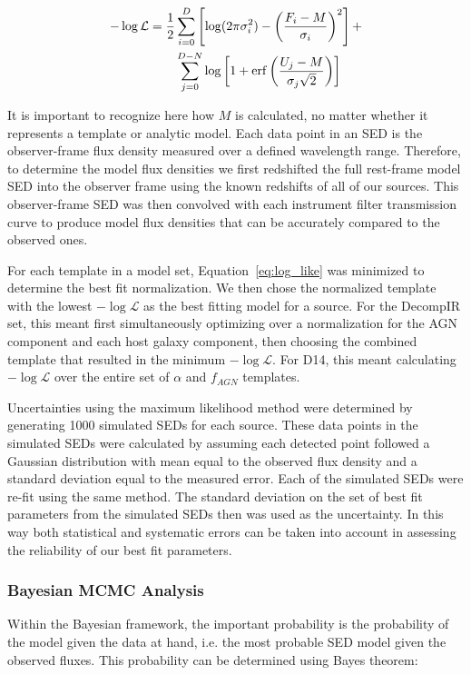 \documentclass[fleqn,usenatbib]{mnras}
\begin{document}
\begin{align}\label{eq:log_like}
-\log\mathcal{L} = \frac{1}{2}&\sum_{i=0}^{D}\left[\log(2\pi\sigma_i^2) - \left(\frac{F_i - M}{\sigma_i}\right)^2\right] + \notag \\
&\sum_{j=0}^{D-N}\log\left[1 + \mathrm{erf}\left(\frac{U_j - M}{\sigma_j\sqrt{2}}\right)\right]
\end{align}

It is important to recognize here how $M$ is calculated, no matter whether it represents a template or analytic model. Each data point in an SED is the observer-frame flux density measured over a defined wavelength range. Therefore, to determine the model flux densities we first redshifted the full rest-frame model SED into the observer frame using the known redshifts of all of our sources. This observer-frame SED was then convolved with each instrument filter transmission curve to produce model flux densities that can be accurately compared to the observed ones.

For each template in a model set, Equation~\ref{eq:log_like} was minimized to determine the best fit normalization. We then chose the normalized template with the lowest $-\log\mathcal{L}$ as the best fitting model for a source. For the DecompIR set, this meant first simultaneously optimizing over a normalization for the AGN component and each host galaxy component, then choosing the combined template that resulted in the minimum $-\log\mathcal{L}$. For D14, this meant calculating $-\log\mathcal{L}$ over the entire set of $\alpha$ and $f_{AGN}$ templates.

Uncertainties using the maximum likelihood method were determined by generating 1000 simulated SEDs for each source. These data points in the simulated SEDs were calculated by assuming each detected point followed a Gaussian distribution with mean equal to the observed flux density and a standard deviation equal to the measured error. Each of the simulated SEDs were re-fit using the same method. The standard deviation on the set of best fit parameters from the simulated SEDs then was used as the uncertainty. In this way both statistical and systematic errors can be taken into account in assessing the reliability of our best fit parameters. 

\subsubsection{Bayesian MCMC Analysis}
Within the Bayesian framework, the important probability is the probability of the model given the data at hand, i.e. the most probable SED model given the observed fluxes. This probability can be determined using Bayes theorem:
\end{document}
